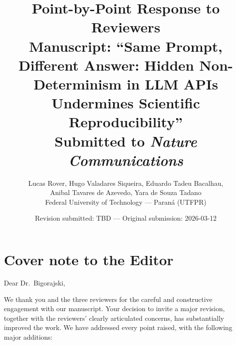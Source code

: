 \documentclass[11pt,a4paper]{article}
\title{\textbf{Point-by-Point Response to Reviewers} \\
\large Manuscript: ``Same Prompt, Different Answer: Hidden Non-Determinism in LLM APIs Undermines Scientific Reproducibility'' \\
\large Submitted to \emph{Nature Communications}}
\author{Lucas Rover, Hugo Valadares Siqueira, Eduardo Tadeu Bacalhau, \\
Anibal Tavares de Azevedo, Yara de Souza Tadano \\
Federal University of Technology --- Paraná (UTFPR)}
\date{Revision submitted: TBD --- Original submission: 2026-03-12}
\begin{document}
\maketitle

\section*{Cover note to the Editor}

Dear Dr.\ Bigorajski,

We thank you and the three reviewers for the careful and constructive engagement with our manuscript. Your decision to invite a major revision, together with the reviewers' clearly articulated concerns, has substantially improved the work. We have addressed every point raised, with the following major additions:
\end{document}
